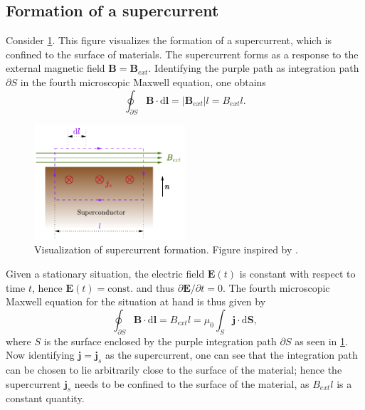\documentclass{report}
\numberwithin{tm}{section}
\newcommand\vect[1]{\ensuremath{\bm{#1}}}
\begin{document}
\subsection{Formation of a supercurrent}
Consider \cref{fig:supercurrent}. This figure visualizes the formation of a supercurrent, which is confined to the surface of materials. The supercurrent forms as a response to the external magnetic field $\vect{B} = \vect{B}_{ext}$. Identifying the purple path as integration path $\partial S$ in the fourth microscopic Maxwell equation, one obtains \begin{equation}
	\oint_{\partial S}\vect{B}\cdot \mathrm{d}\vect{l} = |\vect{B}_{ext}|l = B_{ext}l.
\end{equation}
\begin{figure}[h]
	\centering
	\includegraphics[width=0.5\textwidth]{figures/supercurrent.pdf}
	\caption{Visualization of supercurrent formation. Figure inspired by \cite{Tsirlin.2024}.}
	\label{fig:supercurrent}
\end{figure}
Given a stationary situation, the electric field $\vect{E}(t)$ is constant with respect to time $t$, hence $\vect{E}(t)=\text{const.}$ and thus $\partial \vect{E}/\partial t = 0$. The fourth microscopic Maxwell equation for the situation at hand is thus given by \begin{equation}
	\oint_{\partial S}\vect{B}\cdot \mathrm{d}\vect{l} = B_{ext}l = \mu_0\int_{S}\vect{j}\cdot \mathrm{d}\vect{S},
\end{equation} where $S$ is the surface enclosed by the purple integration path $\partial S$ as seen in \cref{fig:supercurrent}. Now identifying $\vect{j} = \vect{j}_s$ as the supercurrent, one can see that the integration path can be chosen to lie arbitrarily close to the surface of the material; hence the supercurrent $\vect{j}_s$ needs to be confined to the surface of the material, as $B_{ext}l$ is a constant quantity.


	
\end{document}
